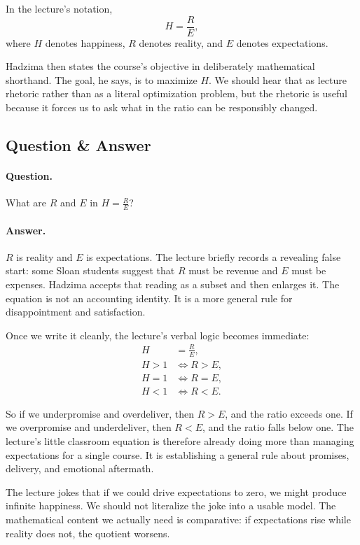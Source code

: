 \begin{definition}
In the lecture's notation,
\[
H=\frac{R}{E},
\]
where \(H\) denotes happiness, \(R\) denotes reality, and \(E\) denotes expectations.
\end{definition}

Hadzima then states the course's objective in deliberately mathematical shorthand. The goal, he says, is to maximize \(H\). We should hear that as lecture rhetoric rather than as a literal optimization problem, but the rhetoric is useful because it forces us to ask what in the ratio can be responsibly changed.

\subsection{Question \& Answer}

\paragraph{Question.} What are \(R\) and \(E\) in \(H=\frac{R}{E}\)?

\paragraph{Answer.} \(R\) is reality and \(E\) is expectations. The lecture briefly records a revealing false start: some Sloan students suggest that \(R\) must be revenue and \(E\) must be expenses. Hadzima accepts that reading as a subset and then enlarges it. The equation is not an accounting identity. It is a more general rule for disappointment and satisfaction.

Once we write it cleanly, the lecture's verbal logic becomes immediate:
\begin{align}
H &= \frac{R}{E}, \\
H>1 &\iff R>E, \\
H=1 &\iff R=E, \\
H<1 &\iff R<E.
\end{align}

So if we underpromise and overdeliver, then \(R>E\), and the ratio exceeds one. If we overpromise and underdeliver, then \(R<E\), and the ratio falls below one. The lecture's little classroom equation is therefore already doing more than managing expectations for a single course. It is establishing a general rule about promises, delivery, and emotional aftermath.

\begin{remark}
The lecture jokes that if we could drive expectations to zero, we might produce infinite happiness. We should not literalize the joke into a usable model. The mathematical content we actually need is comparative: if expectations rise while reality does not, the quotient worsens.
\end{remark}


